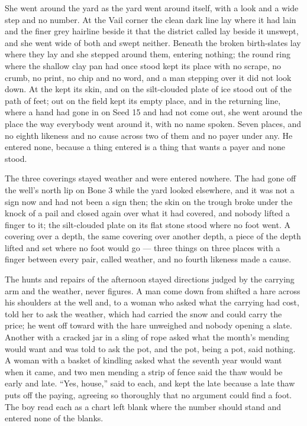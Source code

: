 She went around the yard as the yard went around itself, with a look and a wide step and no number. At the Vail corner the clean dark line lay where it had lain and the finer grey hairline beside it that the district called  lay beside it unswept, and she went wide of both and swept neither. Beneath  the broken birth-slates lay where they lay and she stepped around them, entering nothing; the round ring where the shallow clay pan had once stood kept its place with no scrape, no crumb, no print, no chip and no word, and a man stepping over it did not look down. At  the  kept its skin, and on  the silt-clouded plate of ice stood out of the path of feet; out on  the field kept its empty place, and in the returning line, where a hand had gone in on Seed 15 and had not come out, she went around the place the way everybody went around it, with no name spoken. Seven places, and no eighth likeness and no cause across two of them and no payer under any. He entered none, because a thing entered is a thing that wants a payer and none stood.

The three coverings stayed weather and were entered nowhere. The  had gone off the well's north lip on Bone 3 while the yard looked elsewhere, and it was not a sign now and had not been a sign then; the skin on the trough broke under the knock of a pail and closed again over what it had covered, and nobody lifted a finger to it; the silt-clouded plate on its flat stone stood where no foot went. A covering over a depth, the same covering over another depth, a piece of the depth lifted and set where no foot would go --- three things on three places with a finger between every pair, called weather, and no fourth likeness made a cause.

The hunts and repairs of the afternoon stayed directions judged by the carrying arm and the weather, never figures. A man come down from  shifted a hare across his shoulders at the well and, to a woman who asked what the carrying had cost, told her to ask the weather, which had carried the snow and could carry the price; he went off toward  with the hare unweighed and nobody opening a slate. Another with a cracked jar in a sling of rope asked what the month's mending would want and was told to ask the pot, and the pot, being a pot, said nothing. A woman with a basket of kindling asked what the seventh year would want when it came, and two men mending a strip of fence said the thaw would be early and late. “Yes, house,”  said to each, and kept the late because a late thaw puts off the paying, agreeing so thoroughly that no argument could find a foot. The boy read each as a chart left blank where the number should stand and entered none of the blanks.

